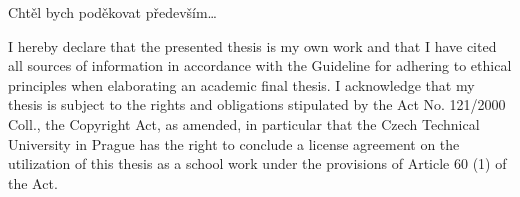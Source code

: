 \documentclass[english,bachelor,unicode]{ctufit-thesis}
\theoremstyle{plain}
\theoremstyle{definition}
\theoremstyle{remark}
\numberwithin{theorem}{chapter}
\begin{document}
 
\frontmatter\frontmatterinit %


\thispagestyle{empty}\cleardoublepage\maketitle %

\imprintpage %

\tableofcontents %


\listoffigures %
\begingroup
\let\clearpage\relax
\endgroup


\begin{acknowledgmentpage}
	Chtěl bych poděkovat především\dots
\end{acknowledgmentpage} 


\begin{declarationpage}
    I hereby declare that the presented thesis is my own work and that I have cited all sources of information in accordance with the Guideline
    for adhering to ethical principles when elaborating an academic final thesis.
    I acknowledge that my thesis is subject to the rights and obligations stipulated by the Act No. 121/2000 Coll.,
    the Copyright Act, as amended, in particular that the Czech Technical University in Prague has the right to conclude
    a license agreement on the utilization of this thesis as a school work under the provisions of Article 60 (1) of the Act.
\end{declarationpage}
\end{document}
